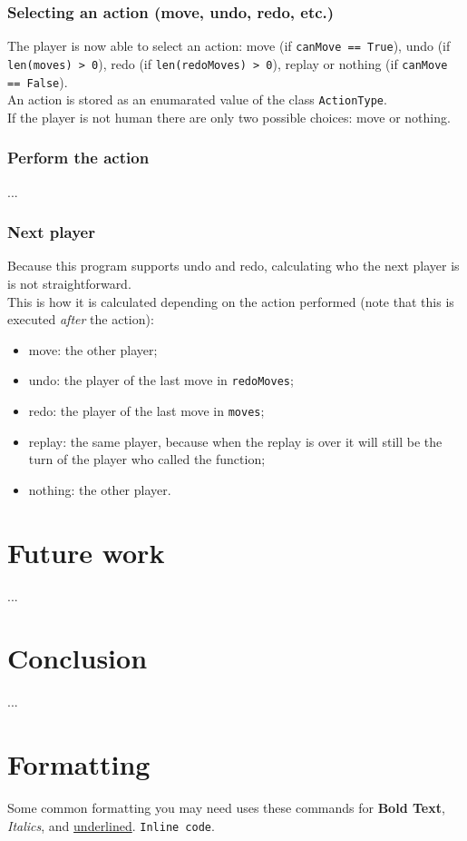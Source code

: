 \documentclass[10pt, a4paper]{article}
\begin{document}
	\subsubsection{Selecting an action (move, undo, redo, etc.)}
	The player is now able to select an action: move (if \texttt{canMove == True}), undo (if \texttt{len(moves) > 0}), redo (if \texttt{len(redoMoves) > 0}), replay or nothing (if \texttt{canMove == False}).\\
	An action is stored as an enumarated value of the class \texttt{ActionType}.\\
	If the player is not human there are only two possible choices: move or nothing.
	
	\subsubsection{Perform the action}
	...
	
	\subsubsection{Next player}
	Because this program supports undo and redo, calculating who the next player is is not straightforward.\\
	This is how it is calculated depending on the action performed (note that this is executed \textit{after} the action):
	\begin{itemize}
		\item move: the other player;
		\item undo: the player of the last move in \texttt{redoMoves};
		\item redo: the player of the last move in \texttt{moves};
		\item replay: the same player, because when the replay is over it will still be the turn of the player who called the function;
		\item nothing: the other player.
	\end{itemize}
	
	\section{Future work}
	...
	
	\section{Conclusion}
	...

	
	\section{Formatting}
	Some common formatting you may need uses these commands for \textbf{Bold Text}, \textit{Italics}, and \underline{underlined}. \texttt{Inline code}.
\end{document}

